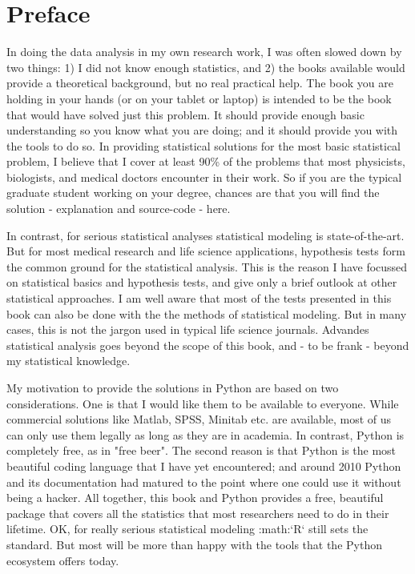 \chapter*{Preface}

In doing the data analysis in my own research work, I was often slowed down by two things: 1) I did not know enough statistics, and 2) the books available would provide a theoretical background, but no real practical help. The book you are holding in your hands (or on your tablet or laptop) is intended to be the book that would have solved just this problem. It should provide enough basic understanding so you know what you are doing; and it should provide you with the tools to do so. In providing statistical solutions for the most basic statistical problem, I believe that I cover at least 90\% of the problems that most physicists, biologists, and medical doctors encounter in their work. So if you are the typical graduate student working on your degree, chances are that you will find the solution - explanation and source-code - here.

In contrast, for serious statistical analyses statistical modeling is state-of-the-art. But for most medical research and life science applications, hypothesis tests form the common ground for the statistical analysis. This is the reason I have focussed on statistical basics and hypothesis tests, and give only a brief outlook at other statistical approaches. I am well aware that most of the tests presented in this book can also be done with the the methods of statistical modeling. But in many cases, this is not the jargon used in typical life science journals. Advandes statistical analysis goes beyond the scope of this book, and - to be frank - beyond my statistical knowledge.

My motivation to provide the solutions in Python are based on two considerations. One is that I would like them to be available to everyone. While commercial solutions like Matlab, SPSS, Minitab etc. are available, most of us can only use them legally as long as they are in academia. In contrast, Python is completely free, as in "free beer". The second reason is that Python is the most beautiful coding language that I have yet encountered; and around 2010 Python and its documentation had matured to
the point where one could use it without being a hacker. All together, this book and Python provides a free, beautiful package that covers all the statistics that most researchers need to do in their lifetime. OK, for really serious statistical modeling :math:`R` still sets the standard.
But most will be more than happy with the tools that the Python ecosystem offers today.

